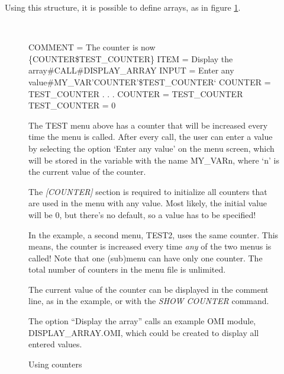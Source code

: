 \documentclass[a4paper]{book}
\renewcommand{\indent}{\hspace*{5mm}}
\begin{document}
Using this structure, it is possible to define arrays, as in figure \ref{fig:counter}.

\begin{figure}[h!tb]
\begin{minipage}[h!tb]{\textwidth}
\hrulefill \\
\begin{ttfamily}
 \newline
\indent COMMENT = The counter is now {\{}COUNTER{\$}TEST{\_}COUNTER{\}} \newline
\indent ITEM = Display the array{\#}CALL{\#}DISPLAY{\_}ARRAY \newline
\indent INPUT = Enter any value{\#}MY{\_}VAR'COUNTER'{\$}TEST{\_}COUNTER` \newline
\indent COUNTER = TEST{\_}COUNTER \newline
 \newline
{} \newline
\indent . \newline
\indent . \newline
\indent . \newline
\indent COUNTER = TEST{\_}COUNTER \newline
 \newline
\noindent[COUNTER] \newline
\indent TEST{\_}COUNTER = 0 \newline
\end{ttfamily}

\noindent The TEST menu above has a counter that will be increased every time the menu 
is called. After every call, the user can enter a value by selecting the 
option `Enter any value' on the menu screen, which will be stored in the 
variable with the name MY{\_}VARn, where `n' is the current value of the 
counter.

The \textsl{[COUNTER]} section is required to initialize all counters that are used in the 
menu with any value. Most likely, the initial value will be 0, but there's 
no default, so a value has to be specified!

In the example, a second menu, TEST2, uses the same counter. This means, the 
counter is increased every time \textit{any} of the two menus is called! Note that 
one (sub)menu can have only one counter. The total number of counters in the 
menu file is unlimited.

The current value of the counter can be displayed in the comment line, as in 
the example, or with the \textsl{SHOW COUNTER} 
command.

The option ``Display the array'' calls an example OMI module, 
DISPLAY{\_}ARRAY.OMI, which could be created to display all entered values.
\caption{Using counters}\label{fig:counter}
\hrulefill
\end{minipage}
\end{figure}
\end{document}
